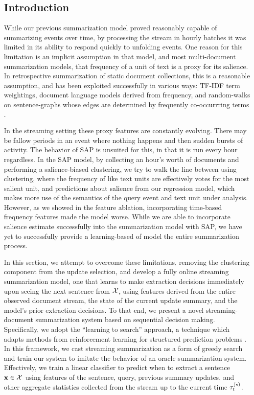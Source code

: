 \subsection{Introduction}

While our previous summarization model proved reasonably capable of
summarizing events over time, by processing the stream in hourly batches it
was limited in its ability to respond quickly to unfolding events. One reason
for this limitation is an implicit assumption in that model, and most
multi-document summarization models, that frequency of a unit of text is a
proxy for its salience. In retrospective summarization of static document
collections, this is a reasonable assumption, and has been exploited
successfully in various ways: TF-IDF term weightings, document language models
derived from frequency, and random-walks on sentence-graphs  whose edges are
determined by frequently co-occurrring terms
\citep{lin2000,radev2004,erkan2004,mihalcea2004,daume2005b,nenkova2005}. 

In the streaming setting these proxy features are constantly evolving. There
may be fallow periods in an event where nothing happens and then sudden
bursts of activity. The behavior of SAP is unsuited for this, in that it 
is run every hour regardless. 
In the SAP model, by collecting an hour's worth of documents and performing a 
salience-biased
clustering, we try to walk the line between using clustering, where the
frequency of like text units are effectively votes for the most salient unit,
and predictions about salience from our regression model, which makes more use
of the semantics of the query event and text unit under analysis.
However, as we showed in the feature ablation, incorporating time-based
frequency features made the model worse. While we are able to incorporate
salience estimate successfully into the summarization model with SAP, we 
have yet to successfully provide a learning-based of model the entire 
summarization process.

In this section, we attempt to overcome these limitations, removing the
clustering component from the update selection, and develop a fully online
streaming summarization model, one that learns to make extraction decisions
immediately upon seeing the next sentence from $\mathcal{X}$, using features
derived from the entire observed document stream, the state of the current
update summary, and the model's prior extraction decisions.  To that end, we
present a novel streaming-document summarization system based on sequential
decision making.  Specifically, we adopt the ``learning to search'' approach,
a technique which adapts methods from reinforcement learning for structured
prediction problems \citep{daume2009,ross2010}.  In this
framework, we cast streaming summarization as a form of greedy search and
train our system to imitate the behavior of an oracle summarization system.
Effectively, we train a linear classifier to predict when to extract a
sentence $\mathbf{x} \in \mathcal{X}$ using features of the sentence, query,
previous summary updates, and other aggregate statistics collected from the
stream up to the current time $\tau^{(s)}_t$. 


